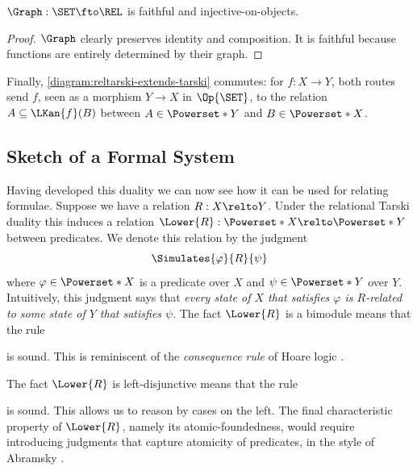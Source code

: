\begin{lemma}
  \(\Graph : \SET \fto \REL\) is faithful and injective-on-objects.
\end{lemma}
\begin{proof}
  \(\Graph\) clearly preserves identity and composition. It is faithful because
  functions are entirely determined by their graph.
\end{proof}

Finally, \eqref{diagram:reltarski-extends-tarski} commutes: for
\(f : X \to Y\), both routes send \(f\), seen as a morphism
\(Y \to X\) in \(\Op{\SET}\), to the relation
\(A \subseteq \LKan{f}(B)\) between \(A \in \Powerset*{Y}\) and
\(B \in \Powerset*{X}\).

\subsection{Sketch of a Formal System}

Having developed this duality we can now see how it can be used for relating
formulae. Suppose we have a relation $R : X \relto Y$. Under the relational
Tarski duality this induces a relation
$\Lower{R} : \Powerset*{X} \relto \Powerset*{Y}$ between predicates. We denote
this relation by the judgment
\[
  \Simulates{\varphi}{R}{\psi}
\]
where $\varphi \in \Powerset*{X}$ is a predicate over $X$ and
$\psi \in \Powerset*{Y}$ over $Y$. Intuitively, this judgment says that
\emph{every state of $X$ that satisfies $\varphi$ is $R$-related to some state
of $Y$ that satisfies $\psi$}. The fact $\Lower{R}$ is a bimodule means that the
rule
\begin{mathpar}
\end{mathpar}
is sound. This is reminiscent of the \emph{consequence rule} of Hoare logic
\cite{hoare_1969}.

The fact $\Lower{R}$ is left-disjunctive means that the rule
\begin{mathpar}
\end{mathpar}
is sound. This allows us to reason by cases on the left. The final
characteristic property of $\Lower{R}$, namely its atomic-foundedness, would
require introducing judgments that capture atomicity of predicates, in the
style of Abramsky \cite{abramsky_1991}.

